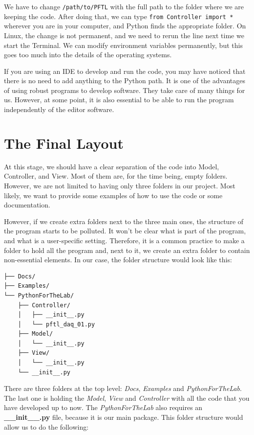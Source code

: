 We have to change \texttt{/path/to/PFTL} with the full path to the folder where we are keeping the code. After doing that, we can type \texttt{from Controller import *} wherever you are in your computer, and Python finds the appropriate folder. On Linux, the change is not permanent, and we need to rerun the line next time we start the Terminal. We can modify environment variables permanently, but this goes too much into the details of the operating systems.

If you are using an IDE to develop and run the code, you may have noticed that there is no need to add anything to the Python path. It is one of the advantages of using robust programs to develop software. They take care of many things for us. However, at some point, it is also essential to be able to run the program independently of the editor software.

\section{The Final Layout}\label{sec:final-layout}
At this stage, we should have a clear separation of the code into Model, Controller, and View. Most of them are, for the time being, empty folders. However, we are not limited to having only three folders in our project. Most likely, we want to provide some examples of how to use the code or some documentation.

However, if we create extra folders next to the three main ones, the structure of the program starts to be polluted. It won't be clear what is part of the program, and what is a user-specific setting. Therefore, it is a common practice to make a folder to hold all the program and, next to it, we create an extra folder to contain non-essential elements. In our case, the folder structure would look like this:

\begin{verbatim}
├── Docs/
├── Examples/
└── PythonForTheLab/
    ├── Controller/
    │   ├── __init__.py
    │   └── pftl_daq_01.py
    ├── Model/
    │   └── __init__.py
    ├── View/
    │   └── __init__.py
    └── __init__.py
\end{verbatim}

There are three folders at the top level: \emph{Docs}, \emph{Examples} and \emph{PythonForTheLab}. The last one is holding the \emph{Model}, \emph{View} and \emph{Controller} with all the code that you have developed up to now. The \emph{PythonForTheLab} also requires an \textbf{\_\_init\_\_.py} file, because it is our main package. This folder structure would allow us to do the following:

